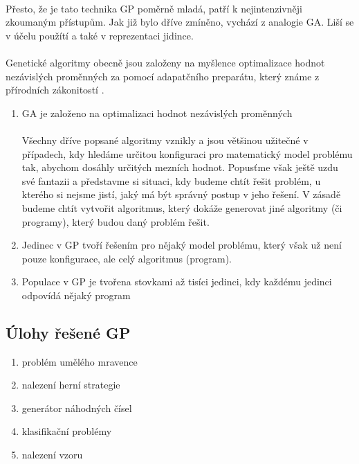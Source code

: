 \documentclass[bc,male,java,dept460]{diploma}		%
\begin{document}
\paragraph*{}
Přesto, že je tato technika GP poměrně mladá, patří k nejintenzivněji zkoumaným přístupům. Jak již bylo dříve zmíněno, vychází z analogie GA. Liší se v účelu použítí a také v reprezentaci jidince.

\paragraph*{}
Genetické algoritmy obecně jsou založeny na myšlence optimalizace hodnot nezávislých proměnných za pomocí adapatčního preparátu, který známe z přírodních zákonitostí \cite{evoltech}.

\begin{enumerate}
\item GA je založeno na optimalizaci hodnot nezávislých proměnných
\paragraph*{}
Všechny dříve popsané algoritmy vznikly a jsou většinou užitečné v případech, kdy hledáme určitou konfiguraci pro matematický model problému tak, abychom dosáhly určitých mezních hodnot. Popusťme však ještě uzdu své fantazii a představme si situaci, kdy budeme chtít řešit problém, u kterého si nejsme jistí, jaký má být správný postup v jeho řešení. V zásadě budeme chtít vytvořit algoritmus, který dokáže generovat jiné algoritmy (či programy), který budou daný problém řešit.

\item Jedinec v GP tvoří řešením pro nějaký model problému, který však už není pouze konfigurace, ale celý algoritmus (program).

\item Populace v GP je tvořena stovkami až tisíci jedinci, kdy každému jedinci odpovídá nějaký program
\end{enumerate}

\subsection{Úlohy řešené GP}
\begin{enumerate}
\item problém umělého mravence
\item nalezení herní strategie
\item generátor náhodných čísel
\item klasifikační problémy
\item nalezení vzoru
\end{enumerate}
\end{document}
